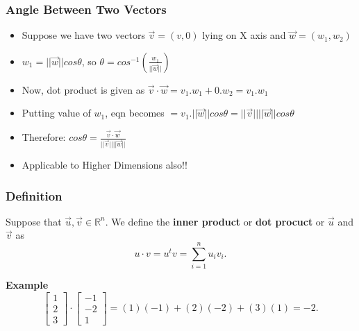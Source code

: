  \begin{frame}[fragile] \frametitle{Angle Between Two Vectors}

 \begin{itemize}
 
\item Suppose we have two vectors $\vec{v} = (v, 0)$ lying on X axis and $\vec{w}= (w_1,w_2)$
\item $w_1 = ||\vec{w}||cos\theta$, so $\theta = cos^{-1}(\frac{w_1}{||\vec{w}||})$
\item Now, dot product is given as $\vec{v}\cdot\vec{w} = v_1.w_1 + 0.w_2 = v_1.w_1$
\item Putting value of $w_1$, eqn becomes $= v_1.||\vec{w}||cos\theta = ||\vec{v}||||\vec{w}||cos\theta$
\item Therefore: $cos\theta = \frac{\vec{v}\cdot\vec{w}}{||\vec{v}||||\vec{w}||}$
\item Applicable to Higher Dimensions also!!
\end{itemize}
 
\end{frame}

\begin{frame}[fragile] \frametitle{Definition}

Suppose that $\vec{u}, \vec{v}\in \mathbb R^n$.  We define the
 \textbf{inner product} or \textbf{dot procuct} or $\vec{u}$ and $\vec{v}$ as
 $$
 u\cdot v = u^tv=\sum_{i=1}^n u_i v_i.
 $$


\textbf{Example}
$$
 \left[ \begin{array}{r} 1\\2\\3 \end{array}\right] \cdot   \left[\begin{array}{r} -1\\-2\\1 \end{array}\right] =
 (1)(-1) + (2)(-2) + (3)(1) = -2.
 $$

\end{frame}

